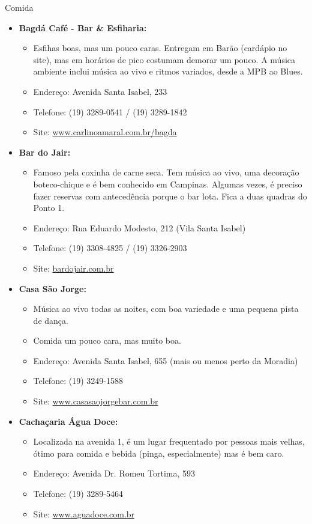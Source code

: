 \begin{story}{Comida}
\begin{itemize}
\item \textbf{Bagdá Café - Bar \& Esfiharia:}
\begin{itemize}
\item Esfihas boas, mas um pouco caras. Entregam em Barão (cardápio no site), mas em horários de pico costumam demorar um pouco. A música ambiente inclui música ao vivo e ritmos variados, desde a MPB ao Blues.
\item Endereço: Avenida Santa Isabel, 233
\item Telefone: (19) 3289-0541 / (19) 3289-1842
\item Site: \url{www.carlinoamaral.com.br/bagda} 
\end{itemize}

\item \textbf{Bar do Jair:}
\begin{itemize}
\item Famoso pela coxinha de carne seca. Tem música ao vivo, uma decoração boteco-chique e é bem conhecido em Campinas. Algumas vezes, é preciso fazer reservas com antecedência porque o bar lota. Fica a duas quadras do Ponto 1.
\item Endereço: Rua Eduardo Modesto, 212 (Vila Santa Isabel)
\item Telefone: (19) 3308-4825 / (19) 3326-2903
\item Site: \url{bardojair.com.br}
\end{itemize}

\item \textbf{Casa São Jorge:}
\begin{itemize}
\item Música ao vivo todas as noites, com boa variedade e uma pequena pista de dança.
\item Comida um pouco cara, mas muito boa.
\item Endereço: Avenida Santa Isabel, 655 (mais ou menos perto da Moradia)
\item Telefone: (19) 3249-1588
\item Site: \url{www.casasaojorgebar.com.br}
\end{itemize}

\item \textbf{Cachaçaria Água Doce:}
\begin{itemize}
\item Localizada na avenida 1, é um lugar frequentado por pessoas mais velhas, ótimo para comida e bebida (pinga, especialmente) mas é bem caro.
\item Endereço: Avenida Dr. Romeu Tortima, 593
\item Telefone: (19) 3289-5464
\item Site: \url{www.aguadoce.com.br}
\end{itemize}


\end{itemize}
\end{story}
